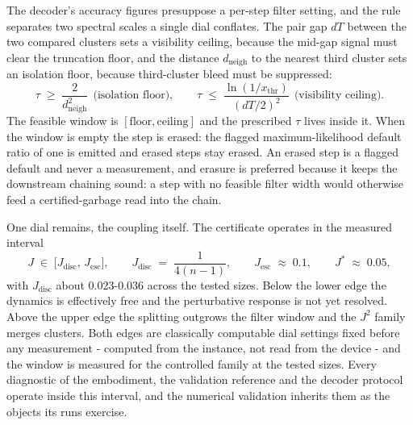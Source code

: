 The decoder's accuracy figures presuppose a per-step filter setting, and the rule separates two spectral scales a single dial conflates. The pair gap $dT$ between the two compared clusters sets a visibility ceiling, because the mid-gap signal must clear the truncation floor, and the distance $d_{\mathrm{neigh}}$ to the nearest third cluster sets an isolation floor, because third-cluster bleed must be suppressed:
\begin{equation}\label{def:decoder-gap-scales}
\tau \;\ge\; \frac{2}{d_{\mathrm{neigh}}^{2}} \ \ \text{(isolation floor)}, \qquad \tau \;\le\; \frac{\ln(1/x_{\mathrm{thr}})}{(dT/2)^{2}} \ \ \text{(visibility ceiling)}.
\end{equation}
The feasible window is $[\mathrm{floor}, \mathrm{ceiling}]$ and the prescribed $\tau$ lives inside it. When the window is empty the step is erased: the flagged maximum-likelihood default ratio of one is emitted and erased steps stay erased. An erased step is a flagged default and never a measurement, and erasure is preferred because it keeps the downstream chaining sound: a step with no feasible filter width would otherwise feed a certified-garbage read into the chain.

One dial remains, the coupling itself. The certificate operates in the measured interval
\begin{equation}\label{def:operating-window}
J \;\in\; \bigl[ J_{\mathrm{disc}},\, J_{\mathrm{esc}} \bigr], \qquad J_{\mathrm{disc}} \;=\; \frac{1}{4(n-1)}, \qquad J_{\mathrm{esc}} \;\approx\; 0.1, \qquad J^{*} \;\approx\; 0.05,
\end{equation}
with $J_{\mathrm{disc}}$ about 0.023-0.036 across the tested sizes. Below the lower edge the dynamics is effectively free and the perturbative response is not yet resolved. Above the upper edge the splitting outgrows the filter window and the $J^2$ family merges clusters. Both edges are classically computable dial settings fixed before any measurement - computed from the instance, not read from the device - and the window is measured for the controlled family at the tested sizes. Every diagnostic of the embodiment, the validation reference and the decoder protocol operate inside this interval, and the numerical validation inherits them as the objects its runs exercise.
